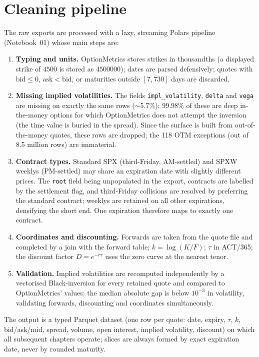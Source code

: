 \section{Cleaning pipeline}\label{sec:pipeline}
The raw exports are processed with a lazy, streaming Polars pipeline (Notebook~01) whose main steps are:
\begin{enumerate}
  \item \textbf{Typing and units.} OptionMetrics stores strikes in thousandths (a displayed strike of $4500$ is stored as $4500000$); dates are parsed defensively; quotes with $\mathrm{bid}\le 0$, $\mathrm{ask}<\mathrm{bid}$, or maturities outside $[7, 730]$ days are discarded.
  \item \textbf{Missing implied volatilities.} The fields \texttt{impl\_volatility}, \texttt{delta} and \texttt{vega} are missing on exactly the same rows ($\sim$5.7\%); $99.98\%$ of these are deep in-the-money options for which OptionMetrics does not attempt the inversion (the time value is buried in the spread). Since the surface is built from out-of-the-money quotes, these rows are dropped; the 118 OTM exceptions (out of 8.5 million rows) are immaterial.
  \item \textbf{Contract types.} Standard SPX (third-Friday, AM-settled) and SPXW weeklys (PM-settled) may share an expiration date with slightly different prices. The \texttt{root} field being unpopulated in the export, contracts are labelled by the settlement flag, and third-Friday collisions are resolved by preferring the standard contract; weeklys are retained on all other expirations, densifying the short end. One expiration therefore maps to exactly one contract.
  \item \textbf{Coordinates and discounting.} Forwards are taken from the quote file and completed by a join with the forward table; $k=\log(K/F)$; $\tau$ in ACT/365; the discount factor $D=e^{-r\tau}$ uses the zero curve at the nearest tenor.
  \item \textbf{Validation.} Implied volatilities are recomputed independently by a vectorised Black-inversion for every retained quote and compared to OptionMetrics' values: the median absolute gap is below $10^{-3}$ in volatility, validating forwards, discounting and coordinates simultaneously.
\end{enumerate}
The output is a typed Parquet dataset (one row per quote: date, expiry, $\tau$, $k$, bid/ask/mid, spread, volume, open interest, implied volatility, discount) on which all subsequent chapters operate; slices are always formed by exact expiration date, never by rounded maturity.


